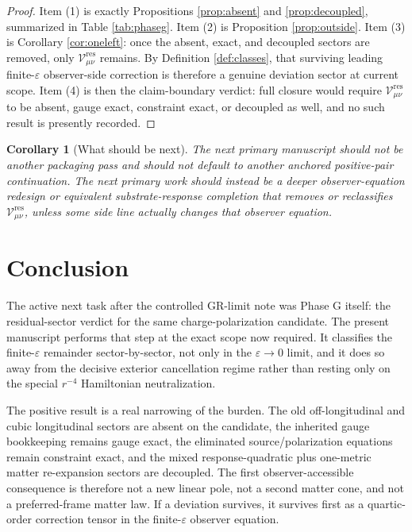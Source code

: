 \documentclass[11pt]{article}
\newcommand{\ResidualCore}{\mathcal V_{\mu\nu}^{\mathrm{res}}}
\newcommand{\epsIR}{\varepsilon}
\newtheorem{corollary}{Corollary}
\begin{document}
\begin{proof}
Item (1) is exactly Propositions \ref{prop:absent} and \ref{prop:decoupled}, summarized in Table \ref{tab:phaseg}. Item (2) is Proposition \ref{prop:outside}. Item (3) is Corollary \ref{cor:oneleft}: once the absent, exact, and decoupled sectors are removed, only \(\ResidualCore\) remains. By Definition \ref{def:classes}, that surviving leading finite-\(\epsIR\) observer-side correction is therefore a genuine deviation sector at current scope. Item (4) is then the claim-boundary verdict: full closure would require \(\ResidualCore\) to be absent, gauge exact, constraint exact, or decoupled as well, and no such result is presently recorded.
\end{proof}

\begin{corollary}[What should be next]
The next primary manuscript should not be another packaging pass and should not default to another anchored positive-pair continuation. The next primary work should instead be a deeper observer-equation redesign or equivalent substrate-response completion that removes or reclassifies \(\ResidualCore\), unless some side line actually changes that observer equation.
\end{corollary}

\section{Conclusion}

The active next task after the controlled GR-limit note was Phase G itself: the residual-sector verdict for the same charge-polarization candidate. The present manuscript performs that step at the exact scope now required. It classifies the finite-\(\epsIR\) remainder sector-by-sector, not only in the \(\epsIR\to0\) limit, and it does so away from the decisive exterior cancellation regime rather than resting only on the special \(r^{-4}\) Hamiltonian neutralization.

The positive result is a real narrowing of the burden. The old off-longitudinal and cubic longitudinal sectors are absent on the candidate, the inherited gauge bookkeeping remains gauge exact, the eliminated source/polarization equations remain constraint exact, and the mixed response-quadratic plus one-metric matter re-expansion sectors are decoupled. The first observer-accessible consequence is therefore not a new linear pole, not a second matter cone, and not a preferred-frame matter law. If a deviation survives, it survives first as a quartic-order correction tensor in the finite-\(\epsIR\) observer equation.
\end{document}
